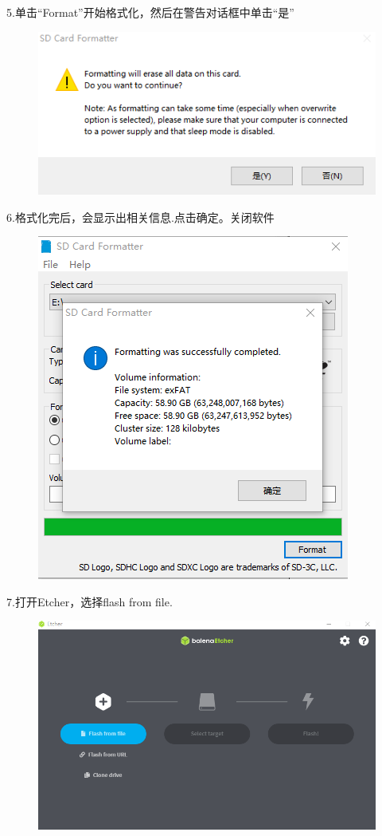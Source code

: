 \documentclass[openbib]{article}
\begin{document}
5.单击“Format”开始格式化，然后在警告对话框中单击“是”

\begin{figure}[H]
	\centering
	\includegraphics[scale=0.4]{b4}
\end{figure}

6.格式化完后，会显示出相关信息.点击确定。关闭软件

\begin{figure}[H]
	\centering
	\includegraphics[scale=0.4]{b5}
\end{figure}

7.打开Etcher，选择flash from file.
\begin{figure}[H]
	\centering
	\includegraphics[scale=0.4]{b6}
\end{figure}
\end{document}
